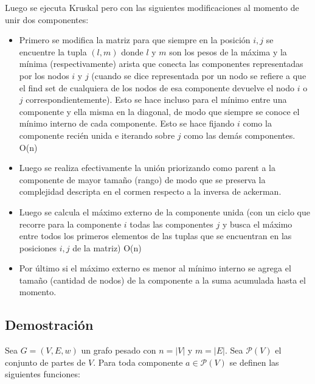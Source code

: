\documentclass[a4paper]{article}
\begin{document}
Luego se ejecuta Kruskal pero con las siguientes modificaciones al momento de unir dos componentes:

\begin{itemize}
    \item  Primero se  modifica la matriz para que siempre en la posición $i,j$ se encuentre la tupla $(l , m)$ donde $l$ y $m$ son los pesos de la máxima y la mínima (respectivamente) arista que conecta las componentes representadas por los nodos $i$ y $j$ (cuando se dice representada por un nodo se refiere a que el find set de cualquiera de los nodos de esa componente devuelve el nodo $i$ o $j$ correspondientemente). Esto se hace incluso para el mínimo entre una componente y ella misma en la diagonal, de modo que siempre se conoce el mínimo interno de cada componente. Esto se hace fijando $i$ como la componente recién unida e iterando sobre $j$ como las demás componentes. O(n)
    \item Luego se realiza efectivamente la unión priorizando como parent a la componente de mayor tamaño (rango) de modo que se preserva la complejidad descripta en el cormen respecto a la inversa de ackerman. 
    
    \item Luego se calcula el máximo externo de la componente unida (con un ciclo que recorre para la componente $i$  todas las componentes $j$ y busca el máximo entre todos los primeros elementos de las tuplas que se encuentran en las posiciones $i,j$ de la matriz) O(n)
    \item Por último si el máximo externo es menor al mínimo interno se agrega el tamaño (cantidad de nodos) de la componente a la suma acumulada hasta el momento.
\end{itemize}


\subsection{Demostración}

Sea $G=(V,E,w)$ un grafo pesado con $n = |V|$ y $m = |E|$. Sea  $\mathcal{P}(V)$ el conjunto de partes de $V$. Para toda componente $a \in  \mathcal{P}(V)$ se definen las siguientes funciones: 
\end{document}
